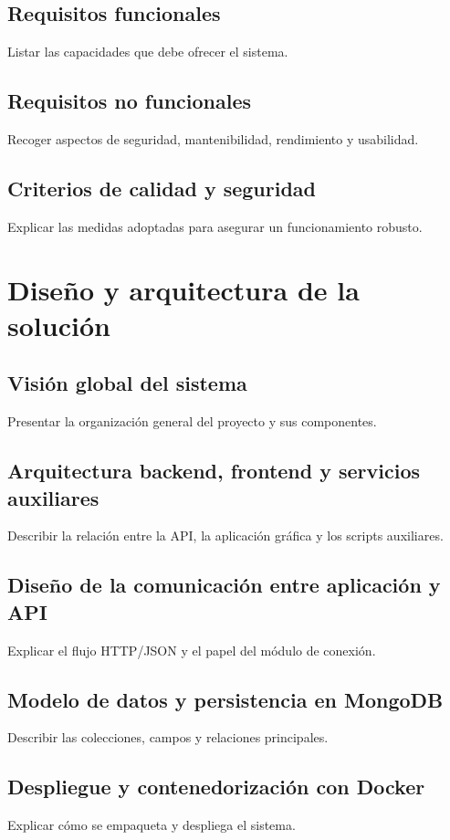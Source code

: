 \documentclass[11pt,spanish,listoffigures,listoftables]{tfgetsinf}
\begin{document}
\section{Requisitos funcionales}
Listar las capacidades que debe ofrecer el sistema.

\section{Requisitos no funcionales}
Recoger aspectos de seguridad, mantenibilidad, rendimiento y usabilidad.

\section{Criterios de calidad y seguridad}
Explicar las medidas adoptadas para asegurar un funcionamiento robusto.

\chapter{Diseño y arquitectura de la solución}
\section{Visión global del sistema}
Presentar la organización general del proyecto y sus componentes.

\section{Arquitectura backend, frontend y servicios auxiliares}
Describir la relación entre la API, la aplicación gráfica y los scripts auxiliares.

\section{Diseño de la comunicación entre aplicación y API}
Explicar el flujo HTTP/JSON y el papel del módulo de conexión.

\section{Modelo de datos y persistencia en MongoDB}
Describir las colecciones, campos y relaciones principales.

\section{Despliegue y contenedorización con Docker}
Explicar cómo se empaqueta y despliega el sistema.
\end{document}
